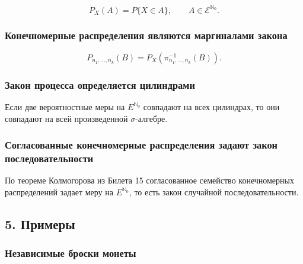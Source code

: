 \documentclass[
  11pt,
  a4paper,
]{article}
\begin{document}
\[
P_X(A)=P\{X\in A\},
\qquad
A\in\mathcal E^{\mathbb N_0}.
\]

\subsubsection{Конечномерные распределения являются маргиналами
закона}\label{ux43aux43eux43dux435ux447ux43dux43eux43cux435ux440ux43dux44bux435-ux440ux430ux441ux43fux440ux435ux434ux435ux43bux435ux43dux438ux44f-ux44fux432ux43bux44fux44eux442ux441ux44f-ux43cux430ux440ux433ux438ux43dux430ux43bux430ux43cux438-ux437ux430ux43aux43eux43dux430}

\[
P_{n_1,\ldots,n_k}(B)
=
P_X(\pi_{n_1,\ldots,n_k}^{-1}(B)).
\]

\subsubsection{Закон процесса определяется
цилиндрами}\label{ux437ux430ux43aux43eux43d-ux43fux440ux43eux446ux435ux441ux441ux430-ux43eux43fux440ux435ux434ux435ux43bux44fux435ux442ux441ux44f-ux446ux438ux43bux438ux43dux434ux440ux430ux43cux438}

Если две вероятностные меры на \(E^{\mathbb N_0}\) совпадают на всех
цилиндрах, то они совпадают на всей произведенной \(\sigma\)-алгебре.

\subsubsection{Согласованные конечномерные распределения задают закон
последовательности}\label{ux441ux43eux433ux43bux430ux441ux43eux432ux430ux43dux43dux44bux435-ux43aux43eux43dux435ux447ux43dux43eux43cux435ux440ux43dux44bux435-ux440ux430ux441ux43fux440ux435ux434ux435ux43bux435ux43dux438ux44f-ux437ux430ux434ux430ux44eux442-ux437ux430ux43aux43eux43d-ux43fux43eux441ux43bux435ux434ux43eux432ux430ux442ux435ux43bux44cux43dux43eux441ux442ux438}

По теореме Колмогорова из Билета 15 согласованное семейство
конечномерных распределений задает меру на \(E^{\mathbb N_0}\), то есть
закон случайной последовательности.

\subsection{5. Примеры}\label{ux43fux440ux438ux43cux435ux440ux44b}

\subsubsection{Независимые броски
монеты}\label{ux43dux435ux437ux430ux432ux438ux441ux438ux43cux44bux435-ux431ux440ux43eux441ux43aux438-ux43cux43eux43dux435ux442ux44b}
\end{document}
